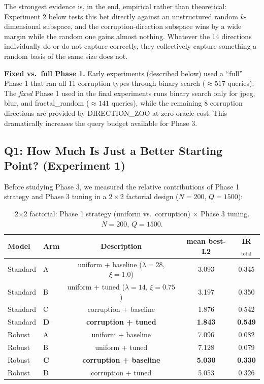 \documentclass[11pt, a4paper]{article}
\begin{document}
The strongest evidence is, in the end, empirical rather than theoretical: Experiment 2 below tests this bet directly against an unstructured random $k$-dimensional subspace, and the corruption-direction subspace wins by a wide margin while the random one gains almost nothing. Whatever the 14 directions individually do or do not capture correctly, they collectively capture something a random basis of the same size does not.

\textbf{Fixed vs.\ full Phase 1.} Early experiments (described below) used a ``full'' Phase 1 that ran all 11 corruption types through binary search ($\approx517$ queries). The \emph{fixed} Phase 1 used in the final experiments runs binary search only for jpeg, blur, and fractal\_random ($\approx141$ queries), while the remaining 8 corruption directions are provided by DIRECTION\_ZOO at zero oracle cost. This dramatically increases the query budget available for Phase 3.

\subsection{Q1: How Much Is Just a Better Starting Point? (Experiment 1)}
\label{sec:q1_phase1}

Before studying Phase 3, we measured the relative contributions of Phase 1 strategy and Phase 3 tuning in a $2\times2$ factorial design ($N=200$, $Q=1500$):

\begin{table}[htbp]
\centering
\caption{2$\times$2 factorial: Phase 1 strategy (uniform vs.\ corruption) $\times$ Phase 3 tuning. $N=200$, $Q=1500$.}
\label{tab:exp_phase1}
\begin{tabular}{llccc}
\toprule
Model & Arm & Description & mean best-L2 & IR$_\text{total}$ \\
\midrule
Standard & A & uniform + baseline ($\lambda=28$, $\xi=1.0$) & 3.093 & 0.345 \\
Standard & B & uniform + tuned ($\lambda=14$, $\xi=0.75$)  & 3.197 & 0.350 \\
Standard & C & corruption + baseline                       & 1.876 & 0.542 \\
Standard & \textbf{D} & \textbf{corruption + tuned}        & \textbf{1.843} & \textbf{0.549} \\
\midrule
Robust   & A & uniform + baseline & 7.096 & 0.082 \\
Robust   & B & uniform + tuned    & 7.128 & 0.079 \\
Robust   & \textbf{C} & \textbf{corruption + baseline} & \textbf{5.030} & \textbf{0.330} \\
Robust   & D & corruption + tuned & 5.053 & 0.326 \\
\bottomrule
\end{tabular}
\end{table}
\end{document}
